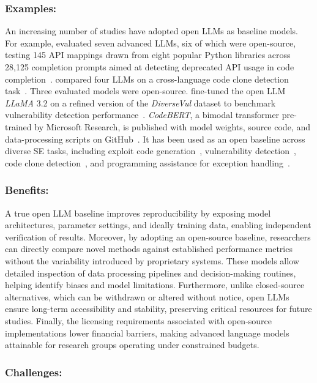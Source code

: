 \documentclass[smallextended]{svjour3}
\newcommand{\guidelinesubsubsection}[1]{\subsubsection{\bfseries #1:}}
\newcommand{\guidelinesubsubsection}[1]{\subsubsection{#1}}
\begin{document}
\guidelinesubsubsection{Examples}

An increasing number of studies have adopted open LLMs as baseline models.
For example, \citeauthor{DBLP:journals/corr/abs-2406-09834} evaluated seven advanced LLMs, six of which were open-source, testing 145 API mappings drawn from eight popular Python libraries across 28,125 completion prompts aimed at detecting deprecated API usage in code completion~\cite{DBLP:journals/corr/abs-2406-09834}.
\citeauthor{DBLP:journals/corr/abs-2408-04430} compared four LLMs on a cross-language code clone detection task~\cite{DBLP:journals/corr/abs-2408-04430}.
Three evaluated models were open-source.
\citeauthor{DBLP:conf/eicc/GoncalvesSC0MPS25} fine-tuned the open LLM \emph{LLaMA} 3.2 on a refined version of the \emph{DiverseVul} dataset to benchmark vulnerability detection performance~\cite{DBLP:conf/eicc/GoncalvesSC0MPS25}.
\emph{CodeBERT}, a bimodal transformer pre-trained by Microsoft Research, is published with model weights, source code, and data-processing scripts on GitHub~\cite{codebert}. It has been used as an open baseline across diverse SE tasks, including exploit code generation~\cite{DBLP:journals/jss/YangZCZHC23}, vulnerability detection~\cite{DBLP:conf/gaiis/XiaSD24}, code clone detection~\cite{DBLP:conf/kbse/SonnekalbGBM22}, and programming assistance for exception handling~\cite{DBLP:conf/icse/CaiYMMN24}.

\guidelinesubsubsection{Benefits}

A true open LLM baseline improves reproducibility by exposing model architectures, parameter settings, and ideally training data, enabling independent verification of results.
Moreover, by adopting an open-source baseline, researchers can directly compare novel methods against established performance metrics without the variability introduced by proprietary systems.
These models allow detailed inspection of data processing pipelines and decision-making routines, helping identify biases and model limitations.
Furthermore, unlike closed-source alternatives, which can be withdrawn or altered without notice, open LLMs ensure long-term accessibility and stability, preserving critical resources for future studies.
Finally, the licensing requirements associated with open-source implementations lower financial barriers, making advanced language models attainable for research groups operating under constrained budgets.

\guidelinesubsubsection{Challenges}
\end{document}
